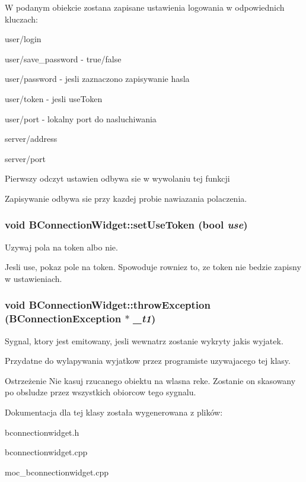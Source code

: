 W podanym obiekcie zostana zapisane ustawienia logowania w odpowiednich kluczach: \begin{DoxyItemize}
\item user/login \item user/save\_\-password -\/ true/false \item user/password -\/ jesli zaznaczono zapisywanie hasla \item user/token -\/ jesli useToken \item user/port -\/ lokalny port do nasluchiwania \item server/address \item server/port\end{DoxyItemize}
Pierwszy odczyt ustawien odbywa sie w wywolaniu tej funkcji

Zapisywanie odbywa sie przy kazdej probie nawiazania polaczenia. \hypertarget{class_b_connection_widget_a80d71ca868172dc623b9fa6c1ab938a6}{
\subsubsection[{setUseToken}]{\setlength{\rightskip}{0pt plus 5cm}void BConnectionWidget::setUseToken (bool {\em use})}}
\label{class_b_connection_widget_a80d71ca868172dc623b9fa6c1ab938a6}


Uzywaj pola na token albo nie. 

Jesli use, pokaz pole na token. Spowoduje rowniez to, ze token nie bedzie zapisny w ustawieniach. \hypertarget{class_b_connection_widget_a8d14da5ae492c481f88adfbcdabf47d2}{
\subsubsection[{throwException}]{\setlength{\rightskip}{0pt plus 5cm}void BConnectionWidget::throwException ({\bf BConnectionException} $\ast$ {\em \_\-t1})}}
\label{class_b_connection_widget_a8d14da5ae492c481f88adfbcdabf47d2}


Sygnal, ktory jest emitowany, jesli wewnatrz zostanie wykryty jakis wyjatek. 

Przydatne do wylapywania wyjatkow przez programiste uzywajacego tej klasy.

\begin{DoxyWarning}{Ostrzeżenie}
Nie kasuj rzucanego obiektu na wlasna reke. Zostanie on skasowany po obsludze przez wszystkich obiorcow tego sygnalu. 
\end{DoxyWarning}


Dokumentacja dla tej klasy została wygenerowana z plików:\begin{DoxyCompactItemize}
\item 
bconnectionwidget.h\item 
bconnectionwidget.cpp\item 
moc\_\-bconnectionwidget.cpp\end{DoxyCompactItemize}
